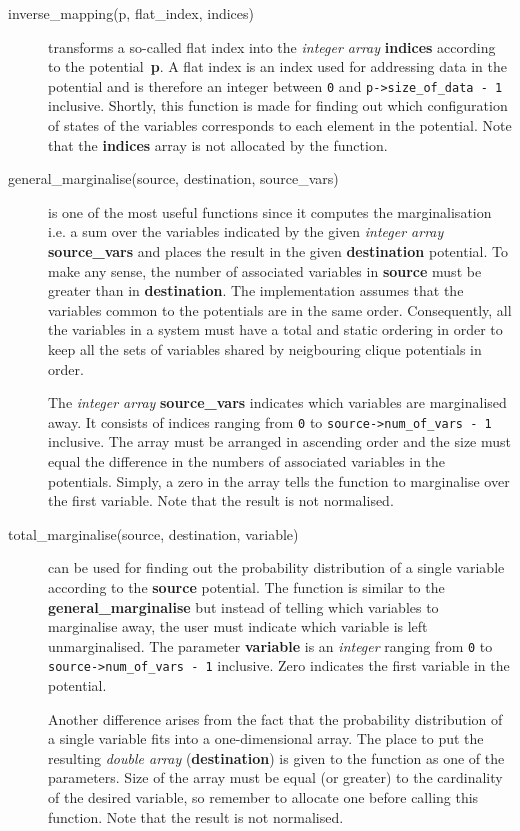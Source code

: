 \documentclass[12pt,a4paper]{report}
\begin{document}
\begin{description}
\item[inverse\_mapping(p, flat\_index, indices)] transforms a
so-called flat index into the {\it integer array} \textbf{indices} according 
to the potential~\textbf{p}. A flat index is an index used for addressing
data in the potential and is therefore an integer between \verb+0+ and 
\verb+p->size_of_data - 1+ inclusive. Shortly, this function is made for
finding out which configuration of states of the variables corresponds
to each element in the potential. Note that the \textbf{indices} array 
is not allocated by the function.

\item[general\_marginalise(source, destination, source\_vars)] is one
of the most useful functions since it computes the marginalisation
i.e. a sum over the variables indicated by the given {\it integer
array} \textbf{source\_vars} and places the result in the given
\textbf{destination} potential. To make any sense, the number of
associated variables in \textbf{source} must be greater than in
\textbf{destination}. The implementation assumes that the variables 
common to the potentials are in the same order. Consequently, all the 
variables in a system must have a total and static ordering in
order to keep all the sets of variables shared by neigbouring clique
potentials in order.

The {\it integer array} \textbf{source\_vars} indicates which
variables are marginalised away. It consists of indices ranging from
\verb+0+ to \verb+source->num_of_vars - 1+ inclusive. The array
must be arranged in ascending order and the size must equal the
difference in the numbers of associated variables in the potentials. 
Simply, a zero in the array tells the function to marginalise over the 
first variable. Note that the result is not normalised.

\item[total\_marginalise(source, destination, variable)] can be used
for finding out the probability distribution of a single variable
according to the \textbf{source} potential. The function is similar to
the \textbf{general\_marginalise} but instead of telling which
variables to marginalise away, the user must indicate which
variable is left unmarginalised. The parameter \textbf{variable} is 
an {\it integer} ranging from \verb+0+ to\\
\verb+source->num_of_vars - 1+ inclusive. Zero indicates the first
variable in the potential.

Another difference arises from the fact that the probability 
distribution of a single variable fits into a one-dimensional array. 
The place to put the resulting {\it double array} 
(\textbf{destination}) is given to the function as one of the
parameters. Size of the array must be equal (or greater) to the
cardinality of the desired variable, so remember to allocate one
before calling this function. Note that the result is not normalised.


\end{description}
\end{document}
